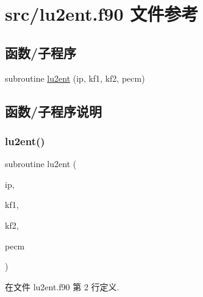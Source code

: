 \hypertarget{lu2ent_8f90}{}\section{src/lu2ent.f90 文件参考}
\label{lu2ent_8f90}
\subsection*{函数/子程序}
\begin{DoxyCompactItemize}
\item 
subroutine \mbox{\hyperlink{lu2ent_8f90_a937d3f117ddc7ae42d62b8a892cbd67a}{lu2ent}} (ip, kf1, kf2, pecm)
\end{DoxyCompactItemize}


\subsection{函数/子程序说明}
\mbox{\label{lu2ent_8f90_a937d3f117ddc7ae42d62b8a892cbd67a}} 
\subsubsection{\texorpdfstring{lu2ent()}{lu2ent()}}
{\footnotesize\ttfamily subroutine lu2ent (\begin{DoxyParamCaption}\item[{}]{ip,  }\item[{}]{kf1,  }\item[{}]{kf2,  }\item[{}]{pecm }\end{DoxyParamCaption})}



在文件 lu2ent.\+f90 第 2 行定义.

